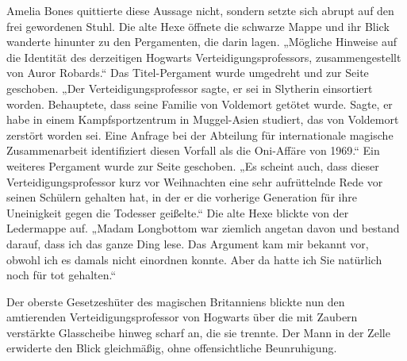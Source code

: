 Amelia Bones quittierte diese Aussage nicht, sondern setzte sich abrupt auf den frei gewordenen Stuhl. Die alte Hexe öffnete die schwarze Mappe und ihr Blick wanderte hinunter zu den Pergamenten, die darin lagen.
„Mögliche Hinweise auf die Identität des derzeitigen Hogwarts Verteidigungsprofessors, zusammengestellt von Auror Robards.“
Das Titel-Pergament wurde umgedreht und zur Seite geschoben. „Der Verteidigungsprofessor sagte, er sei in Slytherin einsortiert worden. Behauptete, dass seine Familie von Voldemort getötet wurde. Sagte, er habe in einem Kampfsportzentrum in Muggel-Asien studiert, das von Voldemort zerstört worden sei. Eine Anfrage bei der Abteilung für internationale magische Zusammenarbeit identifiziert diesen Vorfall als die Oni-Affäre von 1969.“
Ein weiteres Pergament wurde zur Seite geschoben. „Es scheint auch, dass dieser Verteidigungsprofessor kurz vor Weihnachten eine sehr aufrüttelnde Rede vor seinen Schülern gehalten hat, in der er die vorherige Generation für ihre Uneinigkeit gegen die Todesser geißelte.“ Die alte Hexe blickte von der Ledermappe auf. „Madam Longbottom war ziemlich angetan davon und bestand darauf, dass ich das ganze Ding lese. Das Argument kam mir bekannt vor, obwohl ich es damals nicht einordnen konnte. Aber da hatte ich Sie natürlich noch für tot gehalten.“

Der oberste Gesetzeshüter des magischen Britanniens blickte nun den amtierenden Verteidigungsprofessor von Hogwarts über die mit Zaubern verstärkte Glasscheibe hinweg scharf an, die sie trennte. Der Mann in der Zelle erwiderte den Blick gleichmäßig, ohne offensichtliche Beunruhigung.

